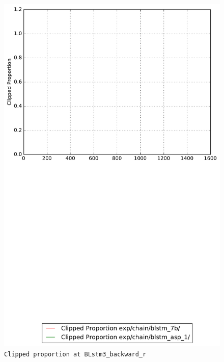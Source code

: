 \documentclass[prl,10pt,twocolumn]{revtex4}
\begin{document}
\newpage
\begin{figure}[h]
  \begin{center}
    \caption{\texttt{Clipped proportion at BLstm3\_backward\_r}}
    \includegraphics[width=\textwidth]{exp/chain/blstm_7b/report/clipped_proportion_BLstm3_backward_r.pdf}
  \end{center}
\end{figure}
\clearpage
\end{document}
